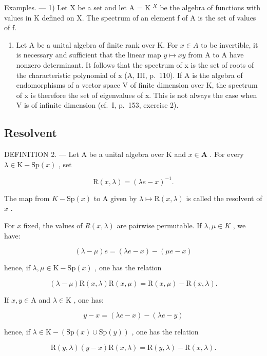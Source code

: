 Examples. --- 1) Let X be a set and let A = K \(^{X}\) be the algebra of functions with values in K defined on X. The spectrum of an element f of A is the set of values of f.

\begin{enumerate}
\def\labelenumi{\arabic{enumi})}
\setcounter{enumi}{1}
\tightlist
\item
  Let A be a unital algebra of finite rank over K. For \(x \in A\) to be invertible, it is necessary and sufficient that the linear map \(y \mapsto xy\) from A to A have nonzero determinant. It follows that the spectrum of x is the set of roots of the characteristic polynomial of x (A, III, p.~110). If A is the algebra of endomorphisms of a vector space V of finite dimension over K, the spectrum of x is therefore the set of eigenvalues of x. This is not always the case when V is of infinite dimension (cf.~I, p.~153, exercise 2).
\end{enumerate}

\subsection{Resolvent}

DEFINITION 2. --- Let A be a unital algebra over K and \(x \in \mathbf{A}\) . For every \(\lambda \in \mathrm{K} - \mathrm{Sp}(x)\) , set

\[
\mathrm{R} (x, \lambda) = (\lambda e - x) ^ {- 1}.
\]

The map from \(K-\mathrm{Sp}(x)\) to A given by \(\lambda\mapsto\mathrm{R}(x,\lambda)\) is called the resolvent of \(x\) .

For \(x\) fixed, the values of \(R(x, \lambda)\) are pairwise permutable. If \(\lambda, \mu \in K\) , we have:

\[
(\lambda - \mu) e = (\lambda e - x) - (\mu e - x)
\]

hence, if \(\lambda, \mu \in \mathrm{K} - \mathrm{Sp}(x)\) , one has the relation

\[
(\lambda - \mu) \mathrm{R} (x, \lambda) \mathrm{R} (x, \mu) = \mathrm{R} (x, \mu) - \mathrm{R} (x, \lambda).\tag{1}
\]

If \(x,y\in \mathrm{A}\) and \(\lambda \in \mathrm{K}\) , one has:

\[
y - x = (\lambda e - x) - (\lambda e - y)
\]

hence, if \(\lambda\in\mathrm{K}-(\mathrm{Sp}(x)\cup\mathrm{Sp}(y))\) , one has the relation

\[
\mathrm{R} (y, \lambda) (y - x) \mathrm{R} (x, \lambda) = \mathrm{R} (y, \lambda) - \mathrm{R} (x, \lambda).\tag{2}
\]

